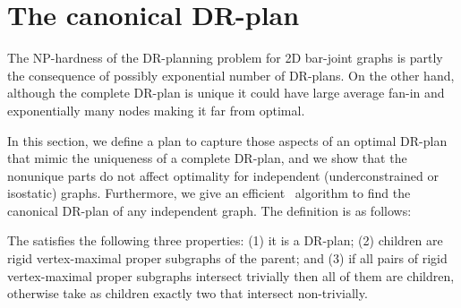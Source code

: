 \section{The canonical DR-plan}
\label{sec:DRP}


The NP-hardness of the DR-planning problem for 2D bar-joint graphs is partly the consequence of possibly exponential number of DR-plans. On the other hand, although the complete DR-plan is unique it could have large average fan-in and exponentially many nodes making it far from optimal.

In this section, we define a  plan to capture those aspects of an optimal DR-plan that mimic the uniqueness of a complete DR-plan, and we show that the nonunique parts do not affect optimality for independent (underconstrained or isostatic) graphs. Furthermore, we give an efficient \candrpcomplexity\ algorithm to find the canonical DR-plan of any independent graph. The definition is as follows:

\begin{definition}\label{def:canonical_drplan}
    The  satisfies the following three properties:
    (1) it is a DR-plan;
    (2) children are rigid vertex-maximal proper subgraphs of the parent; and
    (3) if all pairs of rigid vertex-maximal proper subgraphs intersect trivially then all of them are children, otherwise take as children exactly two that intersect non-trivially.
\end{definition}



